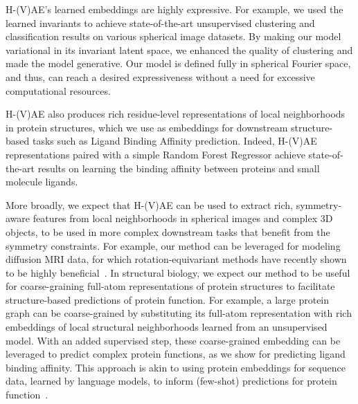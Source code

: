 H-(V)AE's learned embeddings are highly expressive. For example, we used the learned invariants to achieve
state-of-the-art unsupervised clustering and classification results on various spherical image datasets. By making our
model variational in its invariant latent space, we enhanced the quality of clustering and made the model generative.
Our model is defined fully in spherical Fourier space, and thus, can reach a desired expressiveness without a need for
excessive computational resources.

H-(V)AE also produces rich residue-level representations of local neighborhoods in protein structures, which we use as
embeddings for downstream structure-based tasks such as Ligand Binding Affinity prediction. Indeed, H-(V)AE
representations paired with a simple Random Forest Regressor achieve state-of-the-art results on learning the binding
affinity between proteins and small molecule ligands.

More broadly, we expect that H-(V)AE can be used to extract rich, symmetry-aware features from local neighborhoods in
spherical images and complex 3D objects, to be used in more complex downstream tasks that benefit from the symmetry
constraints. For example, our method can be leveraged for modeling diffusion MRI data, for which rotation-equivariant
methods have recently shown to be highly beneficial~\cite{muller_rotation-equivariant_2021}. In structural biology, we
expect our method to be useful for coarse-graining full-atom representations of protein structures to facilitate
structure-based predictions of protein function. For example, a large protein graph can be coarse-grained by
substituting its full-atom representation with rich embeddings of local structural neighborhoods learned from an
unsupervised model. With an added supervised step, these coarse-grained embedding can be leveraged to predict complex
protein functions, as we show for predicting ligand binding affinity. This approach is akin to using protein
embeddings for sequence data, learned by language models, to inform (few-shot) predictions for protein
function~\cite{swanson_predicting_2022}.


